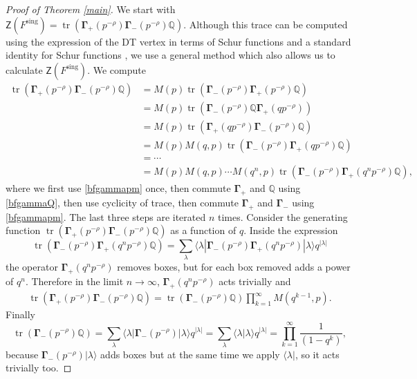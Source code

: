 \documentclass{amsart}
\theoremstyle{definition}
\newcommand{\QQ} {\mathbb{Q}}		%
\newcommand{\bfGamma} {\mathbf{\Gamma}}
\newcommand{\sing}{\mathrm{sing}}
\newcommand{\sfZ} {\mathsf{Z}}
\newcommand{\tr}{\operatorname{tr}}
\begin{document}
\begin{proof}[Proof of Theorem \ref{main}]
We start with $\sfZ(F^{\sing}) = \tr(\bfGamma_+(p^{-\rho}) \bfGamma_-(p^{-\rho}) \QQ)$. Although this trace can be computed using the expression of the DT vertex in terms of Schur functions \cite[(3.18)]{ORV} and a standard identity for Schur functions \cite[Exc.~7.27(f)]{Sta}, we use a general method which also allows us to calculate $\sfZ(F^{\sing})$. We compute 
\begin{align*}
\tr(\bfGamma_+(p^{-\rho}) \bfGamma_-(p^{-\rho}) \QQ) &= M(p) \tr(\bfGamma_-(p^{-\rho}) \bfGamma_+(p^{-\rho}) \QQ) \\
&= M(p) \tr(\bfGamma_-(p^{-\rho}) \QQ \bfGamma_+(qp^{-\rho})) \\
&= M(p) \tr(\bfGamma_+(qp^{-\rho}) \bfGamma_-(p^{-\rho}) \QQ) \\
&= M(p) M(q,p) \tr(\bfGamma_-(p^{-\rho}) \bfGamma_+(qp^{-\rho}) \QQ) \\
&=\cdots \\
&= M(p) M(q,p) \cdots M(q^n,p) \tr(\bfGamma_-(p^{-\rho}) \bfGamma_+(q^np^{-\rho}) \QQ),
\end{align*}
where we first use \eqref{bfgammapm} once, then commute $\bfGamma_+$ and $\QQ$ using \eqref{bfgammaQ}, then use cyclicity of trace, then commute $\bfGamma_+$ and $\bfGamma_-$ using \eqref{bfgammapm}. The last three steps are iterated $n$ times. Consider the generating function $\tr(\bfGamma_+(p^{-\rho}) \bfGamma_-(p^{-\rho}) \QQ)$ as a function of $q$. Inside the expression
$$
\tr(\bfGamma_-(p^{-\rho}) \bfGamma_+(q^n p^{-\rho}) \QQ) = \sum_\lambda \langle \lambda | \bfGamma_-(p^{-\rho}) \bfGamma_+(q^n p^{-\rho}) | \lambda \rangle q^{|\lambda|}
$$
the operator $\bfGamma_+(q^n p^{-\rho})$ removes boxes, but for each box removed adds a power of $q^n$. Therefore in the limit $n \rightarrow \infty$, $\bfGamma_+(q^n p^{-\rho})$ acts trivially and 
\begin{align*}
\tr(\bfGamma_+(p^{-\rho}) \bfGamma_-(p^{-\rho}) \QQ) = \tr(\bfGamma_-(p^{-\rho}) \QQ) \prod_{k=1}^{\infty} M(q^{k-1}, p).
\end{align*}
Finally
$$
\tr(\bfGamma_-(p^{-\rho}) \QQ) = \sum_\lambda \langle \lambda | \bfGamma_-(p^{-\rho}) | \lambda \rangle q^{|\lambda|} = \sum_\lambda \langle \lambda | \lambda \rangle q^{|\lambda|} = \prod_{k=1}^{\infty} \frac{1}{(1-q^k)},
$$
because $\bfGamma_-(p^{-\rho})| \lambda \rangle$ adds boxes but at the same time we apply $\langle \lambda |$, so it acts trivially too.


\end{proof}
\end{document}
